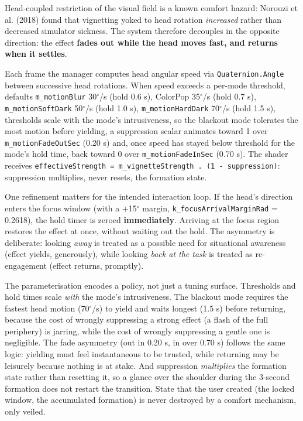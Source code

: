 Head-coupled restriction of the visual field is a known comfort hazard: Norouzi et al. (2018) found
that vignetting yoked to head rotation \textit{increased} rather than decreased simulator sickness. The
system therefore decouples in the opposite direction: the effect \textbf{fades out while the head moves
fast, and returns when it settles}.

Each frame the manager computes head angular speed via \verb|Quaternion.Angle| between successive head
rotations. When speed exceeds a per-mode threshold, defaults \verb|m_motionBlur| 30$^{\circ}$/s (hold 0.6 s),
ColorPop 35$^{\circ}$/s (hold 0.7 s), \verb|m_motionSoftDark| 50$^{\circ}$/s (hold 1.0 s), \verb|m_motionHardDark| 70$^{\circ}$/s (hold
1.5 s), thresholds scale with the mode's intrusiveness, so the blackout mode tolerates the most
motion before yielding, a suppression scalar animates toward 1 over \verb|m_motionFadeOutSec| (0.20 s)
and, once speed has stayed below threshold for the mode's hold time, back toward 0 over
\verb|m_motionFadeInSec| (0.70 s). The shader receives
\verb|effectiveStrength = m_vignetteStrength . (1 - suppression)|: suppression multiplies, never resets,
the formation state.

One refinement matters for the intended interaction loop. If the head's direction enters the focus
window (with a +15$^{\circ}$ margin, \verb|k_focusArrivalMarginRad| = 0.2618), the hold timer is zeroed
\textbf{immediately}. Arriving at the focus region restores the effect at once, without waiting out the
hold. The asymmetry is deliberate: looking \textit{away} is treated as a possible need for situational
awareness (effect yields, generously), while looking \textit{back at the task} is treated as re-engagement
(effect returns, promptly).

The parameterisation encodes a policy, not just a tuning surface. Thresholds and hold times scale
\textit{with} the mode's intrusiveness. The blackout mode requires the fastest head motion (70$^{\circ}$/s) to
yield and waits longest (1.5 s) before returning, because the cost of wrongly suppressing a strong
effect (a flash of the full periphery) is jarring, while the cost of wrongly suppressing a gentle one
is negligible. The fade asymmetry (out in 0.20 s, in over 0.70 s) follows the same logic: yielding
must feel instantaneous to be trusted, while returning may be leisurely because nothing is at stake.
And suppression \textit{multiplies} the formation state rather than resetting it, so a glance over the
shoulder during the 3-second formation does not restart the transition. State that the user created
(the locked window, the accumulated formation) is never destroyed by a comfort mechanism, only veiled.

